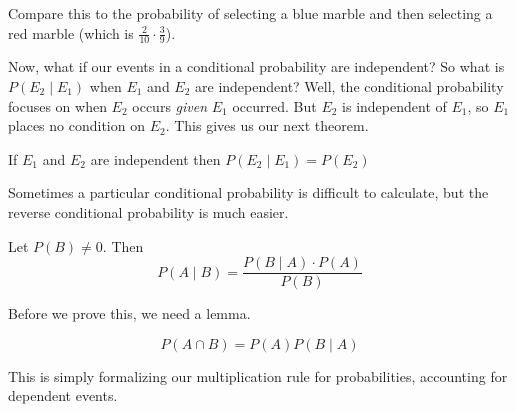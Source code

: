 \documentclass[main.tex]{subfiles}
\begin{document}

\begin{rem}
	Compare this to the probability of selecting a blue marble and then selecting a red marble (which is \(\frac{2}{10} \cdot \frac{3}{9}\)).
\end{rem}

Now, what if our events in a conditional probability are independent? So what is \(P(E_2 \mid E_1)\) when \(E_1\) and \(E_2\) are independent? Well, the conditional probability focuses on when \(E_2\) occurs \textit{given} \(E_1\) occurred. But \(E_2\) is independent of \(E_1\), so \(E_1\) places no condition on \(E_2\). This gives us our next theorem.

\begin{thm}
	If \(E_1\) and \(E_2\) are independent then \(P(E_2 \mid E_1) = P(E_2)\)
\end{thm}


Sometimes a particular conditional probability is difficult to calculate, but the reverse conditional probability is much easier.

\begin{thm}
	Let \(P(B) \neq 0\). Then \[P(A \mid B) = \frac{P(B \mid A) \cdot P(A)}{P(B)}\]
\end{thm}

Before we prove this, we need a lemma.

\begin{prop}
	\[P(A \cap B) = P(A)P(B \mid A)\]
\end{prop}

This is simply formalizing our multiplication rule for probabilities, accounting for dependent events.
\end{document}
